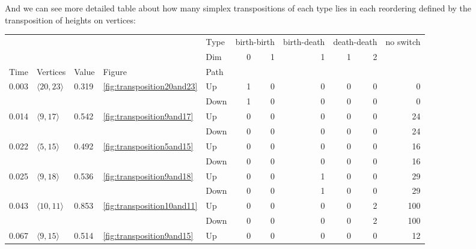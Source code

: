 \documentclass{article}
\begin{document}
\par And we can see more detailed table about how many simplex transpositions of each type lies in each reordering defined by the transposition of heights on vertices:
\begin{center}
\begin{tabular}{lllllrrrrrr}
\toprule
 &  &  &  & Type & \multicolumn{2}{r}{birth-birth} & birth-death & \multicolumn{2}{r}{death-death} & no switch \\
 &  &  &  & Dim & 0 & 1 & 1 & 1 & 2 &  \\
Time & Vertices & Value & Figure & Path &  &  &  &  &  &  \\
\midrule
\multirow[t]{2}{*}{0.003} & \multirow[t]{2}{*}{$\langle20, 23\rangle$} & \multirow[t]{2}{*}{0.319} & \multirow[t]{2}{*}{\ref{fig:transposition20and23}} & Up & 1 & 0 & 0 & 0 & 0 & 0 \\
 &  &  &  & Down & 1 & 0 & 0 & 0 & 0 & 0 \\
\cline{1-11} \cline{2-11} \cline{3-11} \cline{4-11}
\multirow[t]{2}{*}{0.014} & \multirow[t]{2}{*}{$\langle9, 17\rangle$} & \multirow[t]{2}{*}{0.542} & \multirow[t]{2}{*}{\ref{fig:transposition9and17}} & Up & 0 & 0 & 0 & 0 & 0 & 24 \\
 &  &  &  & Down & 0 & 0 & 0 & 0 & 0 & 24 \\
\cline{1-11} \cline{2-11} \cline{3-11} \cline{4-11}
\multirow[t]{2}{*}{0.022} & \multirow[t]{2}{*}{$\langle5, 15\rangle$} & \multirow[t]{2}{*}{0.492} & \multirow[t]{2}{*}{\ref{fig:transposition5and15}} & Up & 0 & 0 & 0 & 0 & 0 & 16 \\
 &  &  &  & Down & 0 & 0 & 0 & 0 & 0 & 16 \\
\cline{1-11} \cline{2-11} \cline{3-11} \cline{4-11}
\multirow[t]{2}{*}{0.025} & \multirow[t]{2}{*}{$\langle9, 18\rangle$} & \multirow[t]{2}{*}{0.536} & \multirow[t]{2}{*}{\ref{fig:transposition9and18}} & Up & 0 & 0 & 1 & 0 & 0 & 29 \\
 &  &  &  & Down & 0 & 0 & 1 & 0 & 0 & 29 \\
\cline{1-11} \cline{2-11} \cline{3-11} \cline{4-11}
\multirow[t]{2}{*}{0.043} & \multirow[t]{2}{*}{$\langle10, 11\rangle$} & \multirow[t]{2}{*}{0.853} & \multirow[t]{2}{*}{\ref{fig:transposition10and11}} & Up & 0 & 0 & 0 & 0 & 2 & 100 \\
 &  &  &  & Down & 0 & 0 & 0 & 0 & 2 & 100 \\
\cline{1-11} \cline{2-11} \cline{3-11} \cline{4-11}
\multirow[t]{2}{*}{0.067} & \multirow[t]{2}{*}{$\langle9, 15\rangle$} & \multirow[t]{2}{*}{0.514} & \multirow[t]{2}{*}{\ref{fig:transposition9and15}} & Up & 0 & 0 & 0 & 0 & 0 & 12 \\

\end{tabular}
\end{center}
\end{document}
